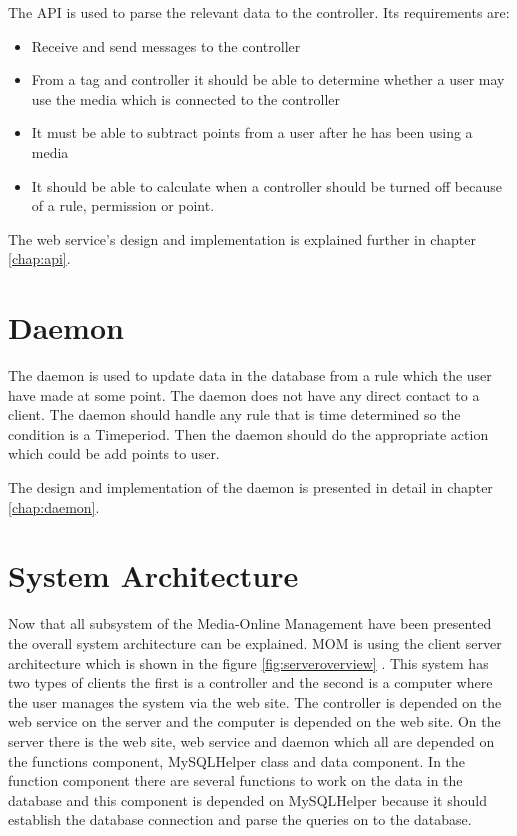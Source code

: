 The API is used to parse the relevant data to the controller. Its requirements are:

\begin{itemize}
	\item Receive and send messages to the controller
	\item From a tag and controller it should be able to determine whether a user may use the media which is connected to the controller
	\item It must be able to subtract points from a user after he has been using a media
	\item It should be able to calculate when a controller should be turned off because of a rule, permission or point.
\end{itemize}

The web service's design and implementation is explained further in chapter \vref{chap:api}.


\section{Daemon}
The daemon is used to update data in the database from a rule which the user have made at some point. The daemon does not have any direct contact to a client. The daemon should handle any rule that is time determined so the condition is a Timeperiod. Then the daemon should do the appropriate action which could be add points to user.

The design and implementation of the daemon is presented in detail in chapter \vref{chap:daemon}. 
 
\section{System Architecture}
\label{sec:sysArchitecture}
Now that all subsystem of the Media-Online Management have been presented the overall system architecture can be explained. MOM is using the client server architecture which is shown in the figure \ref{fig:serveroverview} \citep{OOAD}. This system has two types of clients the first is a controller and the second is a computer where the user manages the system via the web site. The controller is depended on the web service on the server and the computer is depended on the web site. On the server there is the web site, web service and daemon which all are depended on the functions component, MySQLHelper class and data component. In the function component there are several functions to work on the data in the database and this component is depended on MySQLHelper because it should establish the database connection and parse the queries on to the database. 

